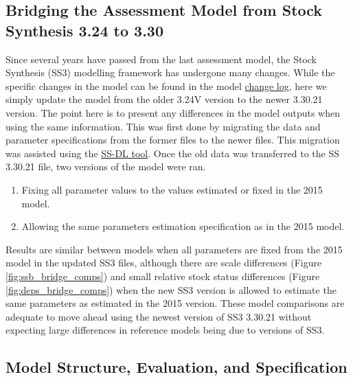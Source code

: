 \documentclass[11pt,
  english,
  letterpaper,
]{article}
\providecommand{\tightlist}{%
  \setlength{\itemsep}{0pt}\setlength{\parskip}{0pt}}
\providecommand{\tightlist}{%
  \setlength{\itemsep}{0pt}\setlength{\parskip}{0pt}}
\begin{document}
\hypertarget{bridging-the-assessment-model-from-stock-synthesis-3.24-to-3.30}{%
\subsection{Bridging the Assessment Model from Stock Synthesis 3.24 to 3.30}\label{bridging-the-assessment-model-from-stock-synthesis-3.24-to-3.30}}

Since several years have passed from the last assessment model, the Stock Synthesis (SS3) modelling framework has undergone many changes. While the specific changes in the model can be found in the model \href{https://github.com/nmfs-stock-synthesis/stock-synthesis/blob/v3.30.19/Change_log_for_SS_3.30.xlsx?raw=true}{change log}, here we simply update the model from the older 3.24V version to the newer 3.30.21 version. The point here is to present any differences in the model outputs when using the same information. This was first done by migrating the data and parameter specifications from the former files to the newer files. This migration was assisted using the \href{https://github.com/shcaba/SS-DL-tool}{SS-DL tool}. Once the old data was transferred to the SS 3.30.21 file, two versions of the model were ran.

\begin{enumerate}
\def\labelenumi{\arabic{enumi})}
\tightlist
\item
  Fixing all parameter values to the values estimated or fixed in the 2015 model.
\item
  Allowing the same parameters estimation specification as in the 2015 model.
\end{enumerate}

Results are similar between models when all parameters are fixed from the 2015 model in the updated SS3 files, although there are scale differences (Figure \ref{fig:ssb_bridge_comps}) and small relative stock status differences (Figure \ref{fig:deps_bridge_comps}) when the new SS3 version is allowed to estimate the same parameters as estimated in the 2015 version. These model comparisons are adequate to move ahead using the newest version of SS3 3.30.21 without expecting large differences in reference models being due to versions of SS3.

\hypertarget{model-structure-evaluation-and-specification}{%
\subsection{Model Structure, Evaluation, and Specification}\label{model-structure-evaluation-and-specification}}
\end{document}
